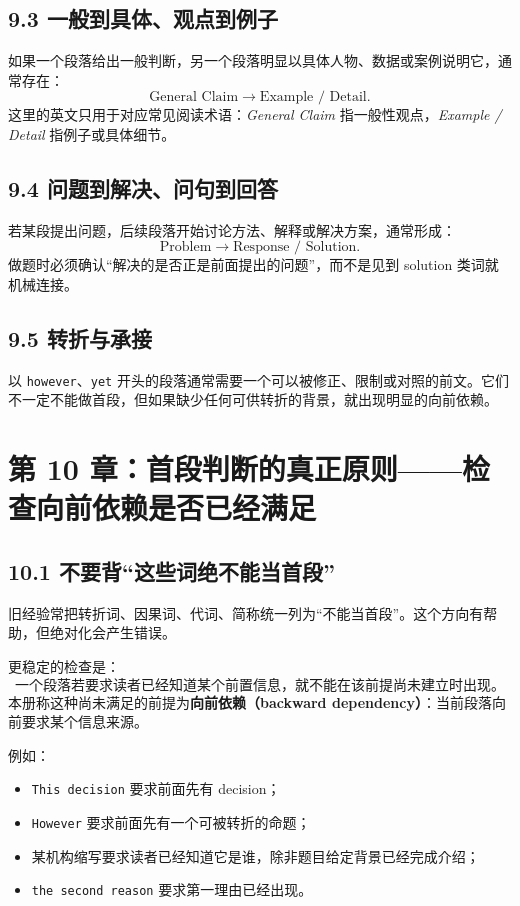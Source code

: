 \documentclass[11pt,a4paper]{ctexart}
\newcommand{\term}[2]{\textbf{#1（#2）}}
\begin{document}
\subsection{9.3 一般到具体、观点到例子}
如果一个段落给出一般判断，另一个段落明显以具体人物、数据或案例说明它，通常存在：
\[
\text{General Claim}
\rightarrow
\text{Example / Detail}.
\]
这里的英文只用于对应常见阅读术语：\textit{General Claim} 指一般性观点，\textit{Example / Detail} 指例子或具体细节。

\subsection{9.4 问题到解决、问句到回答}
若某段提出问题，后续段落开始讨论方法、解释或解决方案，通常形成：
\[
\text{Problem}
\rightarrow
\text{Response / Solution}.
\]
做题时必须确认“解决的是否正是前面提出的问题”，而不是见到 solution 类词就机械连接。

\subsection{9.5 转折与承接}
以 \texttt{however}、\texttt{yet} 开头的段落通常需要一个可以被修正、限制或对照的前文。它们不一定不能做首段，但如果缺少任何可供转折的背景，就出现明显的向前依赖。

\section{第 10 章：首段判断的真正原则——检查向前依赖是否已经满足}

\subsection{10.1 不要背“这些词绝不能当首段”}
旧经验常把转折词、因果词、代词、简称统一列为“不能当首段”。这个方向有帮助，但绝对化会产生错误。

更稳定的检查是：
\[
\boxed{\text{一个段落若要求读者已经知道某个前置信息，就不能在该前提尚未建立时出现。}}
\]
本册称这种尚未满足的前提为\term{向前依赖}{backward dependency}：当前段落向前要求某个信息来源。

例如：
\begin{itemize}
  \item \texttt{This decision} 要求前面先有 decision；
  \item \texttt{However} 要求前面先有一个可被转折的命题；
  \item 某机构缩写要求读者已经知道它是谁，除非题目给定背景已经完成介绍；
  \item \texttt{the second reason} 要求第一理由已经出现。
\end{itemize}
\end{document}
